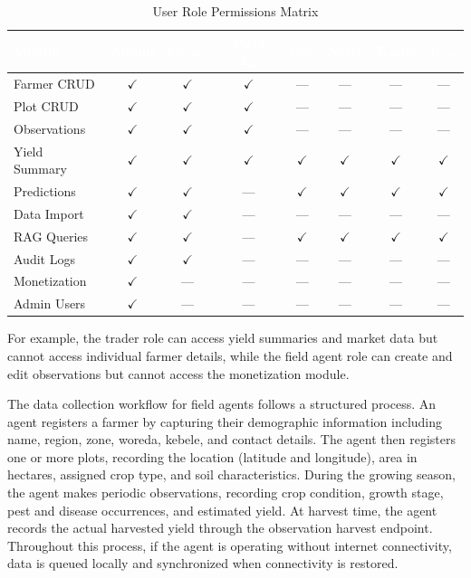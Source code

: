 \documentclass[12pt,a4paper,oneside]{report}
\begin{document}
\begin{table}[H]
\centering
\caption{User Role Permissions Matrix}
\label{tab:roles}
\renewcommand{\arraystretch}{1.4}
\begin{tabularx}{\textwidth}{X*{7}{c}}
\toprule
\rowcolor{headerblue}
\textcolor{white}{\textbf{Module}} & \textcolor{white}{\textbf{Admin}} & \textcolor{white}{\textbf{Super.}} & \textcolor{white}{\textbf{Field Ag.}} & \textcolor{white}{\textbf{Gov}} & \textcolor{white}{\textbf{NGO}} & \textcolor{white}{\textbf{Trader}} & \textcolor{white}{\textbf{Res.}} \\
\midrule
Farmer CRUD & $\checkmark$ & $\checkmark$ & $\checkmark$ & --- & --- & --- & --- \\
\rowcolor{rowalt}
Plot CRUD & $\checkmark$ & $\checkmark$ & $\checkmark$ & --- & --- & --- & --- \\
Observations & $\checkmark$ & $\checkmark$ & $\checkmark$ & --- & --- & --- & --- \\
\rowcolor{rowalt}
Yield Summary & $\checkmark$ & $\checkmark$ & $\checkmark$ & $\checkmark$ & $\checkmark$ & $\checkmark$ & $\checkmark$ \\
Predictions & $\checkmark$ & $\checkmark$ & --- & $\checkmark$ & $\checkmark$ & $\checkmark$ & $\checkmark$ \\
\rowcolor{rowalt}
Data Import & $\checkmark$ & $\checkmark$ & --- & --- & --- & --- & --- \\
RAG Queries & $\checkmark$ & $\checkmark$ & --- & $\checkmark$ & $\checkmark$ & $\checkmark$ & $\checkmark$ \\
\rowcolor{rowalt}
Audit Logs & $\checkmark$ & $\checkmark$ & --- & --- & --- & --- & --- \\
Monetization & $\checkmark$ & --- & --- & --- & --- & --- & --- \\
\rowcolor{rowalt}
Admin Users & $\checkmark$ & --- & --- & --- & --- & --- & --- \\
\bottomrule
\end{tabularx}
\end{table}

For example, the trader role can access yield summaries and market data but cannot access individual farmer details, while the field agent role can create and edit observations but cannot access the monetization module.

The data collection workflow for field agents follows a structured process. An agent registers a farmer by capturing their demographic information including name, region, zone, woreda, kebele, and contact details. The agent then registers one or more plots, recording the location (latitude and longitude), area in hectares, assigned crop type, and soil characteristics. During the growing season, the agent makes periodic observations, recording crop condition, growth stage, pest and disease occurrences, and estimated yield. At harvest time, the agent records the actual harvested yield through the observation harvest endpoint. Throughout this process, if the agent is operating without internet connectivity, data is queued locally and synchronized when connectivity is restored.
\end{document}
